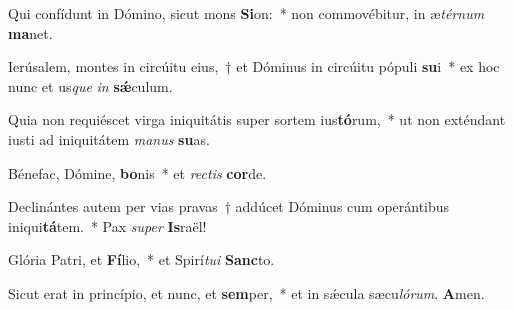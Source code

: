 \item Qui confídunt in Dómino, sicut mons \textbf{Si}on:~* non commovébitur, in æ\textit{térnum} \textbf{ma}net.

\item Ierúsalem, montes in circúitu eius,~† et Dóminus in circúitu pópuli \textbf{su}i~* ex hoc nunc et us\textit{que} \textit{in} \textbf{sǽ}culum.

\item Quia non requiéscet virga iniquitátis super sortem ius\textbf{tó}rum,~* ut non exténdant iusti ad iniquitátem \textit{manus} \textbf{su}as.

\item Bénefac, Dómine, \textbf{bo}nis~* et \textit{rectis} \textbf{cor}de.

\item Declinántes autem per vias pravas~† addúcet Dóminus cum operántibus iniqui\textbf{tá}tem.~* Pax \textit{super} \textbf{Is}raël!

\item Glória Patri, et \textbf{Fí}lio,~* et Spirí\textit{tui} \textbf{Sanc}to.

\item Sicut erat in princípio, et nunc, et \textbf{sem}per,~* et in sǽcula sæcu\textit{lórum}. \textbf{A}men.